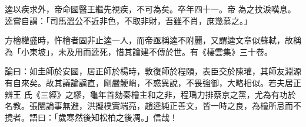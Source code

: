 \begin{pinyinscope}
 逵以疾求外，帝命國醫王繼先視疾，不可為矣。卒年四十一。帝
 為之抆淚嘆息。逵嘗自謂：「司馬溫公不近非色，不取非財，吾雖不肖，庶幾慕之。」



 方檜權盛時，忤檜者固非止逵一人，而帝亟稱逵不附麗，又謂逵文章似蘇軾，故稱為「小東坡」，未及用而逵死，惜其論建不傳於世。有《棲雲集》三十卷。



 論曰：如圭師於安國，居正師於楊時，敦復師於程頤，表臣交於陳瓘，其師友淵源有自來矣。故其議論讜直，剛嚴鯁峭，不惑異說，不畏強御，大略相似。若夫居正辨王
 氏《三經》之繆，龜年首劾秦檜主和之非，程瑀力排蔡京之黨，尤為有功於名教。張闡論事無避，洪擬樸實端亮，趙逵純正善文，皆一時之良，為檜所忌而不撓者。語曰：「歲寒然後知松柏之後凋。」信哉！



\end{pinyinscope}